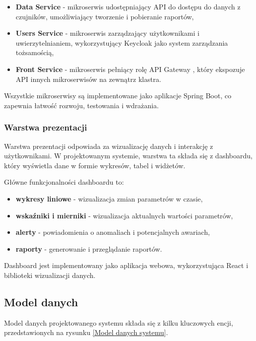 \begin{itemize}
    \item \textbf{Data Service} - mikroserwis udostępniający API do dostępu do danych z czujników, umożliwiający tworzenie i pobieranie raportów,
    \item \textbf{Users Service} - mikroserwis zarządzający użytkownikami i uwierzytelnianiem, wykorzystujący Keycloak jako system zarządzania tożsamością,
    \item \textbf{Front Service} - mikroserwis pełniący rolę API Gateway \cite{api_gateway_definition}, który ekspozuje API innych mikroserwisów na zewnątrz klastra.
\end{itemize}

Wszystkie mikroserwisy są implementowane jako aplikacje Spring Boot, co zapewnia łatwość rozwoju, testowania i wdrażania.

\subsubsection{Warstwa prezentacji}
\label{subsubsec:warstwa_prezentacji}

Warstwa prezentacji odpowiada za wizualizację danych i interakcję z użytkownikami.
W projektowanym systemie, warstwa ta składa się z dashboardu, który wyświetla dane w formie wykresów, tabel i widżetów.

Główne funkcjonalności dashboardu to:

\begin{itemize}
    \item \textbf{wykresy liniowe} - wizualizacja zmian parametrów w czasie,
    \item \textbf{wskaźniki i mierniki} - wizualizacja aktualnych wartości parametrów,
    \item \textbf{alerty} - powiadomienia o anomaliach i potencjalnych awariach,
    \item \textbf{raporty} - generowanie i przeglądanie raportów.
\end{itemize}

Dashboard jest implementowany jako aplikacja webowa, wykorzystująca React i biblioteki wizualizacji danych.

\subsection{Model danych}
\label{subsec:model_danych}

Model danych projektowanego systemu składa się z kilku kluczowych encji, przedstawionych na rysunku \ref{Model danych systemu}.

